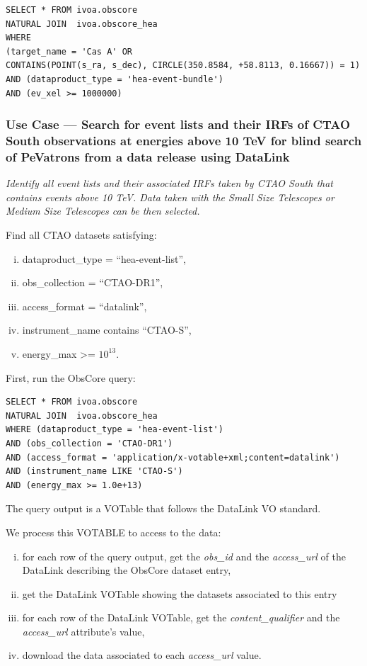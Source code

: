 \begin{verbatim}
SELECT * FROM ivoa.obscore
NATURAL JOIN  ivoa.obscore_hea
WHERE
(target_name = 'Cas A' OR
CONTAINS(POINT(s_ra, s_dec), CIRCLE(350.8584, +58.8113, 0.16667)) = 1)
AND (dataproduct_type = 'hea-event-bundle')
AND (ev_xel >= 1000000)
\end{verbatim}

\subsubsection{Use Case --- Search for event lists and their \glspl{IRF} of CTAO South observations at energies above 10 TeV for blind search of PeVatrons from a data release using DataLink}

{\em Identify all event lists and their associated \glspl{IRF} taken by CTAO South that contains events above 10 TeV. Data taken with the Small Size Telescopes or Medium Size Telescopes can be then selected. \/}

\medskip
\noindent Find all CTAO datasets satisfying:
\begin{enumerate}[(i)]
  \item dataproduct\_type = ``hea-event-list'',
  \item obs\_collection = ``CTAO-DR1'',
  \item access\_format = ``datalink'',
  \item instrument\_name contains ``CTAO-S'',
  \item energy\_max >= $10^{13}$.
\end{enumerate}

First, run the ObsCore query:
\begin{verbatim}
SELECT * FROM ivoa.obscore
NATURAL JOIN  ivoa.obscore_hea
WHERE (dataproduct_type = 'hea-event-list')
AND (obs_collection = 'CTAO-DR1')
AND (access_format = 'application/x-votable+xml;content=datalink')
AND (instrument_name LIKE 'CTAO-S')
AND (energy_max >= 1.0e+13)
\end{verbatim}

The query output is a VOTable that follows the DataLink VO standard.

We process this VOTABLE to access to the data:
\begin{enumerate}[(i)]
  \item for each row of the query output, get the {\em obs\_id\/} and the {\em access\_url\/} of the DataLink describing the ObsCore dataset entry,
  \item get the DataLink VOTable showing the datasets associated to this entry
  \item for each row of the DataLink VOTable, get the {\em content\_qualifier\/} and the {\em access\_url\/} attribute's value,
  \item download the data associated to each {\em access\_url\/} value.
\end{enumerate}


